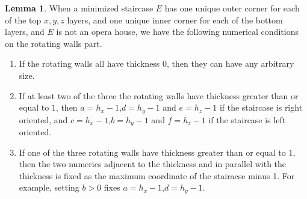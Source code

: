 \documentclass{amsart}[10pt]
\theoremstyle{plain}
\theoremstyle{definition}
\newtheorem{lemma}[theorem]{Lemma}
\begin{document}
\begin{lemma}
\label{rotatingwallscondition}
When a minimized staircase $E$ has one unique outer corner for each of the top $x,y,z$ layers, and one unique inner corner for each of the bottom layers, and $E$ is not an opera house, we have the following numerical conditions on the rotating walls part.

\begin{enumerate}
\item If the rotating walls all have thickness $0$, then they can have any arbitrary size.
\item If at least two of the three the rotating walls have thickness greater than or equal to $1$, then $a=h_x-1$,$d=h_y-1$ and $e=h_z-1$ if the staircase is right oriented, and $c=h_x-1$,$b=h_y-1$ and $f=h_z-1$ if the staircase is left oriented.

\item If one of the three rotating walls have thickness greater than or equal to $1$, then the two numerics adjacent to the thickness and in parallel with the thickness is fixed as the maximum coordinate of the stairacse minus 1. For example, setting $b>0$ fixes $a=h_x-1$,$d=h_y-1$.
\end{enumerate} 


\end{lemma}
\end{document}
